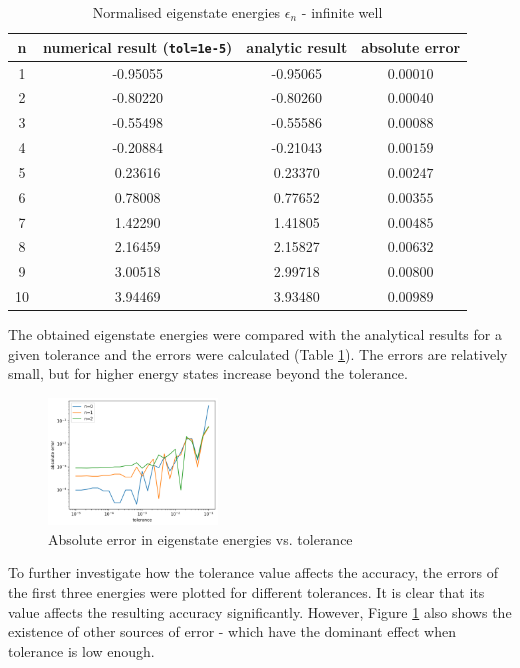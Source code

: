 \documentclass[11pt]{article}
\begin{document}
\begin{table}[t]
  \centering
  \caption{Normalised eigenstate energies $\epsilon_n$ - infinite well}
  \label{tab:1}
  \vspace{-.3cm}
  \begin{tabular}{c|c|c|c}
    n & numerical result (\texttt{tol=1e-5}) & analytic result & absolute error\\
    \hline
    1 & -0.95055 & -0.95065 & $0.00010$\\
    2 & -0.80220 & -0.80260 & $0.00040$\\
    3 & -0.55498 & -0.55586 & $0.00088$\\
    4 & -0.20884 & -0.21043 & $0.00159$\\
    5 &  0.23616 &  0.23370 & $0.00247$\\
    6 &  0.78008 &  0.77652 & $0.00355$\\
    7 &  1.42290 &  1.41805 & $0.00485$\\
    8 &  2.16459 &  2.15827 & $0.00632$\\
    9 &  3.00518 &  2.99718 & $0.00800$\\
    10 &  3.94469 &  3.93480 & $0.00989$

  \end{tabular}
\end{table}

The obtained eigenstate energies were compared with the analytical
results for a given tolerance and the errors were calculated
(Table \ref{tab:1}). The errors are relatively small, but 
for higher energy states increase beyond the tolerance.

\begin{figure}
  \vspace{-1cm}
  \centering
  \captionsetup{width=0.4\textwidth}
  \includegraphics*[width=0.4\textwidth]{error_vs_tol.png}
  \vspace{-.3cm}
  \caption{Absolute error in eigenstate energies vs. tolerance}
  \label{fig:1}
\end{figure}

To further investigate how the tolerance 
value affects the accuracy, the errors of the first three energies were
plotted for different tolerances.
It is clear that its value affects the resulting accuracy significantly.
However, Figure \ref{fig:1} also shows the existence of other sources of error - 
which have the dominant effect when tolerance is low enough.
\end{document}
